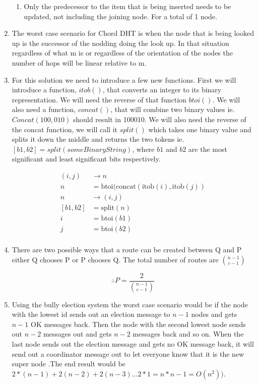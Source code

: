 \documentclass{article}
\begin{document}
\begin{enumerate}
\begin{enumerate}
	\item Only the predecessor to the item that is being inserted needs to be updated, not including the joining node. For a total of 1 node.
\end{enumerate}

\item The worst case scenario for Chord DHT is when the node that is being looked up is the successor of the nodding doing the look up. In that situation regardless of what m is or regardless of the orientation of the nodes the number of hops will be linear relative to m. 

\item For this solution we need to introduce a few new functions. First we will introduce a function, \( itob()\), that converts an integer to its binary representation. We will need the reverse of that function \(btoi()\). We will also need a function, \(concat()\), that will combine two binary values ie. \(Concat(100,010)\) should result in 100010.  We will also need the reverse of the concat function, we will call it \(split()\) which takes one binary value and splits it down the middle and returns the two tokens ie. \([b1,b2]=split(someBinaryString)\), where \( b1\) and \(b2\) are the most significant and least significant bits respectively.

\[
\begin{split}
(i,j) & \rightarrow n \\
n & = \text{btoi}(\text{concat}(\text{itob}(i),\text{itob}(j)) \\
n & \rightarrow(i,j) \\
[b1,b2] & = \text{split}(n) \\
i & = \text{btoi}(b1) \\
j & = \text{btoi}(b2) \\
\end{split}
\]
	
\item
There are two possible ways that a route can be created between Q and P either Q chooses P or P chooses Q. The total number of routes are \( \binom{n-1}{c-1}\)

\[
\therefore P = \frac{2}{\binom{n-1}{c-1}}
\]

\item Using the bully election system the worst case scenario would be if the node with the lowest id sends out an election message to \(n-1\) nodes and gets \(n-1\) OK messages back. Then the node with the second lowest node sends out \(n-2\) messages out and gets \(n-2\) messages back and so on. When the last node sends out the election message and gets no OK message back, it will send out a coordinator message out to let everyone know that it is the new super node .The end result would be \(2*(n-1)+2(n-2)+2(n-3)... 2*1= n*n-1 = O(n^2)) \).


\end{enumerate}
\end{document}
